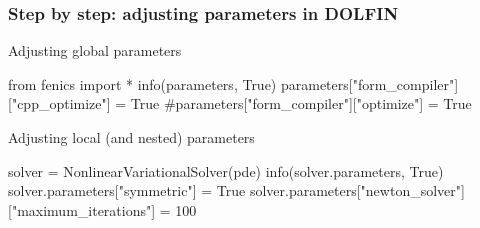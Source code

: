 \begin{frame}[fragile]
  \frametitle{Step by step: adjusting parameters in DOLFIN}

  \bigskip

  Adjusting global parameters
\vspace{-1em}
  \begin{python}
from fenics import *
info(parameters, True)
parameters["form_compiler"]["cpp_optimize"] = True
#parameters["form_compiler"]["optimize"] = True
  \end{python}

  \bigskip

  Adjusting local (and nested) parameters
\vspace{-1em}
  \begin{python}
solver = NonlinearVariationalSolver(pde)
info(solver.parameters, True)
solver.parameters["symmetric"] = True
solver.parameters["newton_solver"]["maximum_iterations"] = 100
  \end{python}
\normalsize

\end{frame}
